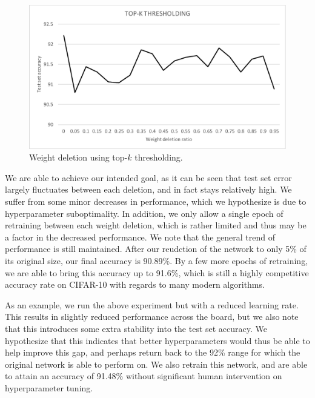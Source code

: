 \documentclass[10pt,twocolumn,letterpaper]{article}
\begin{document}
\begin{figure}[h]
  \centering
  \includegraphics[width=\linewidth]{cifar-top-k.pdf}
  \caption{Weight deletion using top-$k$ thresholding.}
  \label{fig:vgg-top-k}
\end{figure}

We are able to achieve our intended goal, as it can be seen that test set error largely fluctuates between each deletion, and in fact stays relatively high.
We suffer from some minor decreases in performance, which we hypothesize is due to hyperparameter suboptimality.
In addition, we only allow a single epoch of retraining between each weight deletion, which is rather limited and thus may be a factor in the decreased performance.
We note that the general trend of performance is still maintained.
After our reudction of the network to only 5\% of its original size, our final accuracy is 90.89\%.
By a few more epochs of retraining, we are able to bring this accuracy up to 91.6\%, which is still a highly competitive accuracy rate on CIFAR-10 with regards to many modern algorithms.

As an example, we run the above experiment but with a reduced learning rate.
This results in slightly reduced performance across the board, but we also note that this introduces some extra stability into the test set accuracy.
We hypothesize that this indicates that better hyperparameters would thus be able to help improve this gap, and perhaps return back to the 92\% range for which the original network is able to perform on.
We also retrain this network, and are able to attain an accuracy of 91.48\% without significant human intervention on hyperparameter tuning.
\end{document}
